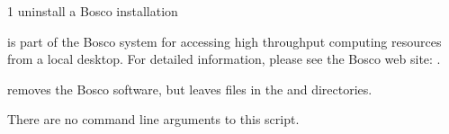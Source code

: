 \begin{ManPage}{\label{man-bosco-uninstall}}{1}
{uninstall a Bosco installation}


\Synopsis {}

 is part of the Bosco system for accessing high
throughput computing resources from a local desktop.
For detailed information, please see the Bosco web site:
.

 removes the Bosco software, 
but leaves files in the  and  directories.

There are no command line arguments to this script.


\end{ManPage}
